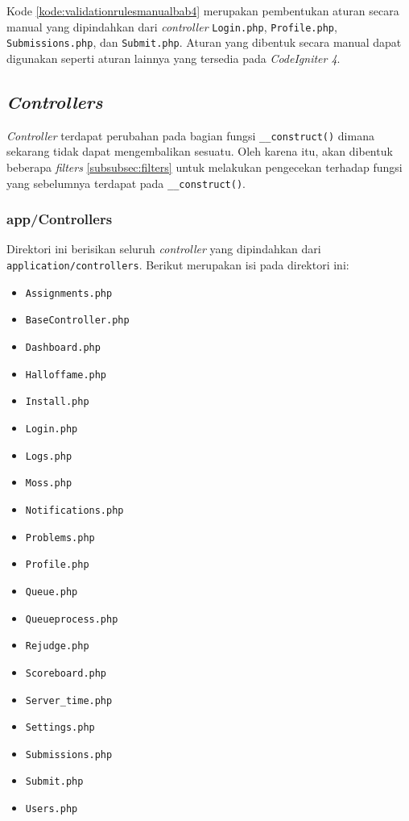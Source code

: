Kode \ref{kode:validationrulesmanualbab4} merupakan pembentukan aturan secara manual yang dipindahkan dari \textit{controller} \texttt{Login.php}, \texttt{Profile.php}, \texttt{Submissions.php}, dan \texttt{Submit.php}. Aturan yang dibentuk secara manual dapat digunakan seperti aturan lainnya yang tersedia pada \textit{CodeIgniter 4}.

\subsection{\textit{Controllers}}
\textit{Controller} terdapat perubahan pada bagian fungsi \texttt{\_\_construct()} dimana sekarang tidak dapat mengembalikan sesuatu. Oleh karena itu, akan dibentuk beberapa \textit{filters} \ref{subsubsec:filters} untuk melakukan pengecekan terhadap fungsi yang sebelumnya terdapat pada \texttt{\_\_construct()}.
	\subsubsection{app/Controllers} 
	Direktori ini berisikan seluruh \textit{controller} yang dipindahkan dari \texttt{application/controllers}. Berikut merupakan isi pada direktori ini:
	\begin{itemize}
		\item \texttt{Assignments.php}
		\item \texttt{BaseController.php}
		\item \texttt{Dashboard.php}
		\item \texttt{Halloffame.php}
		\item \texttt{Install.php}
		\item \texttt{Login.php}
		\item \texttt{Logs.php}
		\item \texttt{Moss.php}
		\item \texttt{Notifications.php}
		\item \texttt{Problems.php}
		\item \texttt{Profile.php}
		\item \texttt{Queue.php}
		\item \texttt{Queueprocess.php}
		\item \texttt{Rejudge.php}
		\item \texttt{Scoreboard.php}
		\item \texttt{Server\_time.php}
		\item \texttt{Settings.php}
		\item \texttt{Submissions.php}
		\item \texttt{Submit.php}
		\item \texttt{Users.php}
	\end{itemize}

